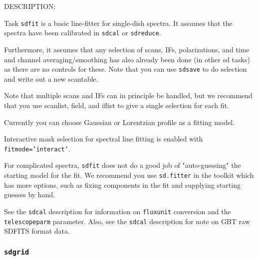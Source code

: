 DESCRIPTION:

Task {\tt sdfit} is a basic line-fitter for single-dish spectra.
It assumes that the spectra have been calibrated in {\tt sdcal}
or {\tt sdreduce}.

Furthermore, it assumes that any selection of scans, IFs,
polarizations, and time and channel averaging/smoothing has
also already been done (in other sd tasks) as there are no controls
for these.  Note that you can use {\tt sdsave} to do selection and write
out a new scantable.

Note that multiple scans and IFs can in principle be handled, but
we recommend that you use scanlist, field, and iflist to give a
single selection for each fit.

Currently you can choose Gaussian or Lorentzian profile as a fitting model.
    
Interactive mask selection for spectral line fitting is enabled with
{\tt fitmode='interact'}. 
    
For complicated spectra, {\tt sdfit} does not do a good job of
"auto-guessing" the starting model for the fit.  We recommend
you use {\tt sd.fitter} in the toolkit which has more options, such
as fixing components in the fit and supplying starting guesses
by hand.

See the {\tt sdcal} description for information on {\tt fluxunit} 
conversion and the {\tt telescopeparm} parameter.
Also, see the {\tt sdcal} description for note on GBT raw SDFITS format data.



\subsubsection{{\tt sdgrid}}
\label{section::sd.sdtasks.tasks.sdgrid}

